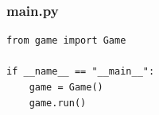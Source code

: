 \subsubsection*{main.py}
\lstset{language=Python}
\begin{lstlisting}
from game import Game

if __name__ == "__main__":
    game = Game()
    game.run()

\end{lstlisting}

